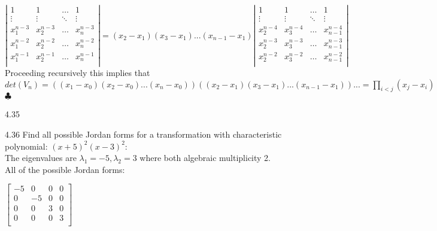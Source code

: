 \documentclass[12pt]{article}
\newenvironment{problems}{\begin{list}{}{\setlength{\labelwidth}{.7in}}}{\end{list}}
\begin{document}
\begin{problems}
  $\left|  \begin{array}{ccccc}
    1           & 1              & \dots      & 1        \\
   \vdots                & \vdots                   & \ddots     & \vdots                \\
   x_1^{n-3}  & x_2^{n-3}    & \dots      & x_n^{n-3} \\
    x_1^{n-2} & x_2^{n-2}     & \dots      & x_n^{n-2} \\
   x_1^{n-1}  & x_2^{n-1}    & \dots      &x_n^{n-1}      \\
  \end{array}           \right|
   = 
   (x_2-x_1)(x_3-x_1)...(x_{n-1}-x_1)
   \left|  \begin{array}{ccccc}
    1           & 1              & \dots      & 1        \\
   \vdots                & \vdots                   & \ddots     & \vdots                \\
   x_2^{n-4}  & x_3^{n-4}    & \dots      & x_{n-1}^{n-4} \\
    x_2^{n-3} & x_3^{n-3}     & \dots      & x_{n-1}^{n-3} \\
   x_2^{n-2}  & x_3^{n-2}    & \dots      &x_{n-1}^{n-2}      \\
  \end{array}     \right| $
  \\ 
  
  Proceeding recursively this implies that $det(V_n) = ((x_1-x_0)(x_2-x_0)...(x_n-x_0))((x_2-x_1)(x_3-x_1)...(x_{n-1}-x_1))... = \prod_{i<j}\! (x_j-x_i)$ \hfill $\clubsuit$\\
  
  \item[4.35]
  
  \item[4.36]
  Find all possible Jordan forms for a transformation with characteristic polynomial: $(x+5)^2(x-3)^2$:\\
  
  The eigenvalues are $\lambda_1 = -5,\lambda_2 = 3$ where both algebraic multiplicity 2.\\
  All of the possible Jordan forms:
  
  $\begin{bmatrix}
   -5 & 0  & 0 & 0 \\
   0  & -5 & 0 & 0 \\
   0  & 0  & 3 & 0 \\
   0  & 0  & 0 & 3 \\
  \end{bmatrix} 
  $
  

\end{problems}
\end{document}
